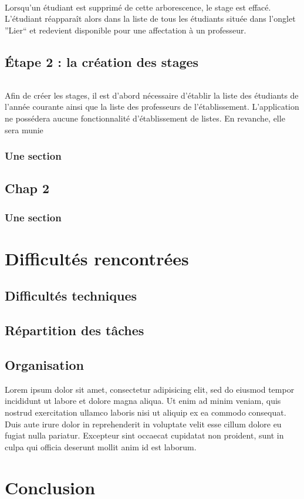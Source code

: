 \documentclass[a4paper,10pt]{report}
\begin{document}
		\paragraph{}
		  Lorsqu'un étudiant est supprimé de cette arborescence, le stage est effacé.
		  L'étudiant réapparaît alors dans la liste de tous les étudiants située dans l'onglet ''Lier`` et redevient disponible pour une affectation à un professeur.
		  
		  
	      
	      
  \chapter{Étape 2 : la création des stages}
    \paragraph{}
      Afin de créer les stages, il est d'abord nécessaire d'établir la liste des étudiants de l'année courante ainsi que la liste des professeurs de l'établissement.
      L'application ne possédera aucune fonctionnalité d'établissement de listes.
      En revanche, elle sera munie  
    
    
    
    \section{Une section}
  \chapter{Chap 2}
    \section{Une section}
\part{Difficultés rencontrées}
  \chapter{Difficultés techniques}
  \chapter{Répartition des tâches}
  \chapter{Organisation}
Lorem ipsum dolor sit amet, consectetur adipisicing elit, sed do eiusmod tempor incididunt ut labore et dolore magna aliqua. Ut enim ad minim veniam, quis nostrud exercitation ullamco laboris nisi ut aliquip ex ea commodo consequat. Duis aute irure dolor in reprehenderit in voluptate velit esse cillum dolore eu fugiat nulla pariatur. Excepteur sint occaecat cupidatat non proident, sunt in culpa qui officia deserunt mollit anim id est laborum.

\part{Conclusion}
\end{document}
